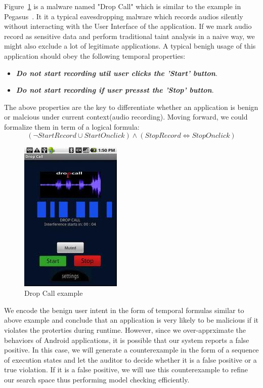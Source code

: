 \documentclass{article}
\begin{document}
Figure~\ref{dropcall} is a malware named "Drop Call" which is similar to
the example in Pegasus~\cite{pegasus}. It it a typical 
eavesdropping malware which records audios silently without interacting with the
User Interface of the application. If we mark audio record as sensitive data 
and perform traditional taint analysis in a naive way, we might also 
exclude a lot of legitimate applications. A typical benigh usage of this 
application should obey the following temporal properties: 
\begin{itemize}
\item {\bf \emph{Do not start recording util user clicks the 'Start' button}}. 
\item {\bf \emph{Do not start recording if user pressst the 'Stop' button}}. 
\end{itemize}
The above properties are the key to differentiate whether an application is 
benign or malcious under current context(audio recording). Moving forward,
we could formalize them in term of a logical formula:
\[
(\neg StartRecord \cup StartOnclick)    
\land (StopRecord \iff StopOnclick)    
\]

\begin{figure}[ht!]
\centering
\includegraphics[scale=0.8]{dropped-call.jpg}
\caption{Drop Call example\label{dropcall}}
\end{figure}

We encode the benign user intent in the form of temporal formulas similar to 
above example and conclude that an application is very likely to be 
malicious if it violates the proterties during runtime. However, since we 
over-apprximate the behaviors of Android applications, it is possible that 
our system reports a false positive. In this case, we will generate a 
counterexample in the form of a sequence of execution states and let the auditor
to decide whether it is a false positive or a true violation. If it is a false
positive, we will use this counterexample to refine our search space thus
performing model checking efficiently.
\end{document}
